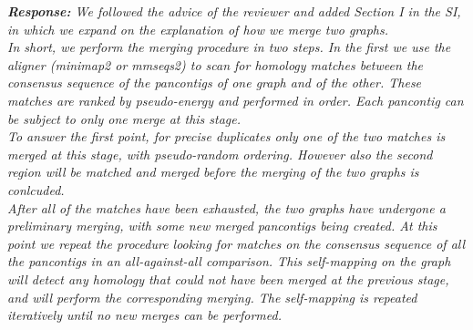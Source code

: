 \documentclass[aps,rmp,onecolumn]{revtex4-1}
\newcommand{\response}[1]{{\it {\color{response}\textbf{Response:} #1}}\vskip 5mm}
\begin{document}
\response{We followed the advice of the reviewer and added Section I in the SI, in which we expand on the explanation of how we merge two graphs.\\
      In short, we perform the merging procedure in two steps. In the first we use the aligner (minimap2 or mmseqs2) to scan for homology matches between the consensus sequence of the pancontigs of one graph and of the other. These matches are ranked by pseudo-energy and performed in order. Each pancontig can be subject to only one merge at this stage.\\
      To answer the first point, for precise duplicates only one of the two matches is merged at this stage, with pseudo-random ordering. However also the second region will be matched and merged before the merging of the two graphs is conlcuded.\\
      After all of the matches have been exhausted, the two graphs have undergone a preliminary merging, with some new merged pancontigs being created. At this point we repeat the procedure looking for matches on the consensus sequence of all the pancontigs in an all-against-all comparison. This self-mapping on the graph will detect any homology that could not have been merged at the previous stage, and will perform the corresponding merging. The self-mapping is repeated iteratively until no new merges can be performed.
}
\end{document}
